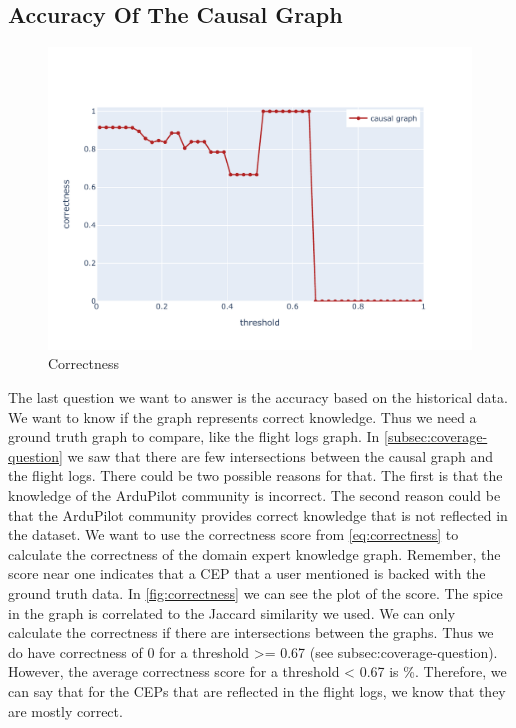 \subsection{Accuracy Of The Causal Graph}\label{subsec:accurate-question}
\begin{figure}
    \begin{center}
        \includegraphics[scale=.65]{figures/results/correctness}
        \caption{Correctness}\label{fig:correctness}
    \end{center}
\end{figure}
The last question we want to answer is the accuracy based on the historical data.
We want to know if the graph represents correct knowledge.
Thus we need a ground truth graph to compare, like the flight logs graph.
In \autoref{subsec:coverage-question} we saw that there are few intersections between the causal graph and the flight logs.
There could be two possible reasons for that.
The first is that the knowledge of the ArduPilot community is incorrect.
The second reason could be that the ArduPilot community provides correct knowledge that is not reflected in the dataset.
We want to use the correctness score from \autoref{eq:correctness} to calculate the correctness of the domain expert knowledge graph.
Remember, the score near one indicates that a \ac{CEP} that a user mentioned is backed with the ground truth data.
In \autoref{fig:correctness} we can see the plot of the score.
The spice in the graph is correlated to the Jaccard similarity we used.
We can only calculate the correctness if there are intersections between the graphs.
Thus we do have correctness of 0 for a threshold >= 0.67 (see subsec:coverage-question).
However, the average correctness score for a threshold < 0.67 is \%.
Therefore, we can say that for the \ac{CEP}s that are reflected in the flight logs, we know that they are mostly correct.

